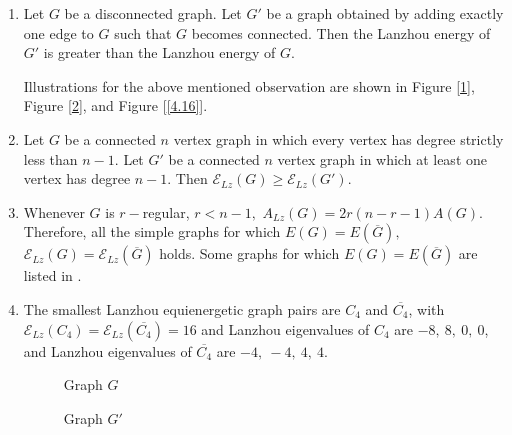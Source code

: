 \documentclass[10pt,a4paper,oneside]{article}
\begin{document}
\begin{enumerate}
	\item Let $G$ be a disconnected graph. Let $G'$ be a graph obtained by adding exactly one edge to $G$ such that $G$ becomes connected. Then the Lanzhou energy of $G'$ is greater than the Lanzhou energy of $G.$ 
	
	Illustrations for the above mentioned observation are shown in Figure [\ref{4.14}], Figure [\ref{4.15}], and Figure [\ref{4.16}].
	
	\item Let $G$ be a connected $n$ vertex graph in which every vertex has degree strictly less than $n-1.$ Let $G'$ be a connected $n$ vertex graph in which at least one vertex has degree $n-1.$ Then $\mathcal{E}_{Lz}(G)\geq \mathcal{E}_{Lz}(G').$
	
	\item Whenever $G$ is $r-$regular, $r<n-1,$ $A_{Lz}(G)=2r(n-r-1)A(G).$ Therefore, all the simple graphs for which $E(G)=E(\overline{G}),$ $\mathcal{E}_{Lz}(G)=\mathcal{E}_{Lz}(\overline{G})$ holds. Some graphs for which $E(G)=E(\overline{G})$ are listed in \cite{26}.
	
	\item The smallest Lanzhou equienergetic graph pairs are $C_4$ and $\overline{C_4}$, with $\mathcal{E}_{Lz}(C_4)=\mathcal{E}_{Lz}(\overline{C_4})=16$ and Lanzhou eigenvalues of $C_4$ are $-8,\ 8,\ 0,\ 0$, and Lanzhou eigenvalues of $\overline{C_4}$ are $-4,\ -4,\ 4,\ 4.$
	\begin{figure}[H]
		\centering
			\caption{Graph $G$}\label{4.14}
		\end{figure}
		
		\vspace{1.0cm}
		\begin{figure}[H]
			\centering
			\caption{Graph $G'$}\label{4.15}
		\end{figure}
		

\end{enumerate}
\end{document}
